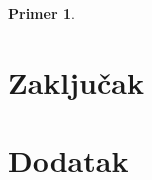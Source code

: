 \documentclass[a4paper]{article}
\newtheorem{primer}{Primer}[section]
\begin{document}
\begin{primer}

\end{primer}


\section{Zaključak}
\label{sec:zakljucak}

 


\appendix
\section{Dodatak}
\end{document}
